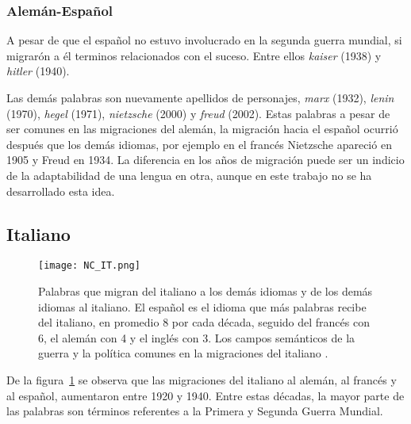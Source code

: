 

  
\subsubsection*{Alemán-Español}%

A pesar de que el español no estuvo involucrado en la segunda guerra mundial, si migrarón a él terminos relacionados con el suceso.  Entre ellos \textit{kaiser} (1938) y \textit{hitler} (1940). 

Las demás palabras son nuevamente  apellidos de personajes, \textit{marx} (1932), \textit{lenin} (1970), \textit{hegel} (1971),  \textit{nietzsche} (2000) y \textit{freud} (2002). Estas palabras a pesar de ser comunes en las migraciones del alemán, la migración hacia el español ocurrió después que los demás idiomas, por ejemplo en el francés Nietzsche apareció en 1905 y Freud en 1934. La diferencia en los años de migración puede ser un indicio de la adaptabilidad de una lengua en otra, aunque en este trabajo no se ha desarrollado esta idea. 






\subsection{Italiano}
 
 
\begin{figure}[h!]
	\centering
	\texttt{[image: NC\_IT.png]}
	\caption{Palabras que migran del italiano a los demás idiomas y de los demás idiomas al italiano.  El español es el idioma que más palabras recibe del italiano, en promedio 8 por cada década, seguido del francés con 6,  el alemán con 4 y el inglés con 3. Los campos semánticos de la guerra y la política comunes en la migraciones del italiano .} 
	\label{fig.NC_IT}
\end{figure}




De la figura~\ref{fig.NC_IT} se observa que las migraciones del italiano al alemán, al francés y al español, aumentaron  entre 1920 y 1940. Entre estas décadas, la mayor parte de las palabras son términos referentes a la Primera y Segunda Guerra Mundial. 

